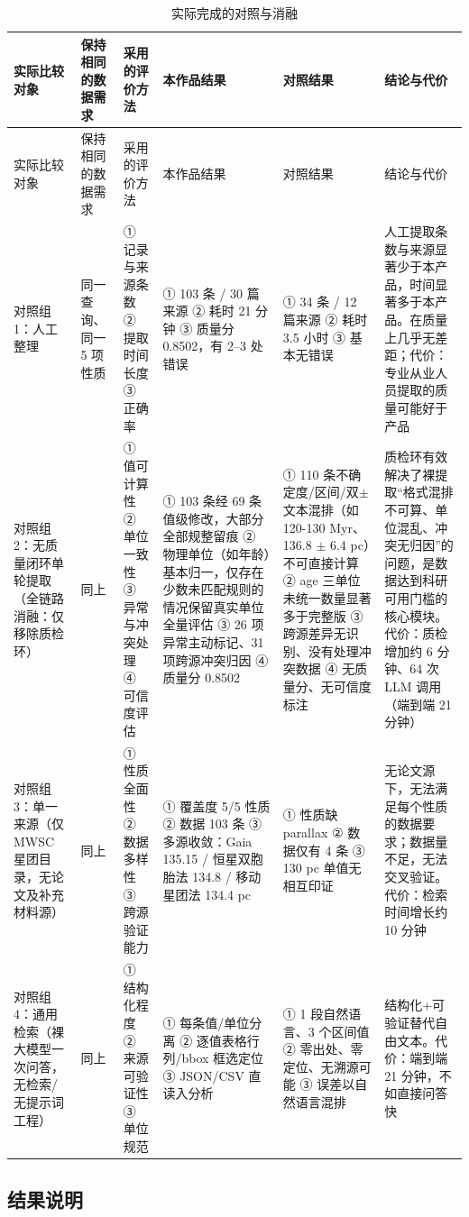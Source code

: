 \begin{longtable}{@{}p{2.3cm}p{1.9cm}p{2.4cm}p{3.0cm}p{2.9cm}p{2.2cm}@{}}
\caption{实际完成的对照与消融}\label{tab:ablation}\\
\toprule
实际比较对象 & 保持相同的数据需求 & 采用的评价方法 & 本作品结果 & 对照结果 & 结论与代价 \\
\midrule
\endfirsthead
\toprule
实际比较对象 & 保持相同的数据需求 & 采用的评价方法 & 本作品结果 & 对照结果 & 结论与代价 \\
\midrule
\endhead
对照组 1：人工整理 & 同一查询、同一 5 项性质 & ① 记录与来源条数 ② 提取时间长度 ③ 正确率 & ① 103 条 / 30 篇来源 ② 耗时 21 分钟 ③ 质量分 0.8502，有 2--3 处错误 & ① 34 条 / 12 篇来源 ② 耗时 3.5 小时 ③ 基本无错误 & 人工提取条数与来源显著少于本产品，时间显著多于本产品。在质量上几乎无差距；代价：专业从业人员提取的质量可能好于产品 \\
对照组 2：无质量闭环单轮提取（全链路消融：仅移除质检环） & 同上 & ① 值可计算性 ② 单位一致性 ③ 异常与冲突处理 ④ 可信度评估 & ① 103 条经 69 条值级修改，大部分全部规整留痕 ② 物理单位（如年龄）基本归一，仅存在少数未匹配规则的情况保留真实单位全量评估 ③ 26 项异常主动标记、31 项跨源冲突归因 ④ 质量分 0.8502 & ① 110 条不确定度/区间/双$\pm$ 文本混排（如 120-130 Myr、136.8 $\pm$ 6.4 pc）不可直接计算 ② age 三单位未统一数量显著多于完整版 ③ 跨源差异无识别、没有处理冲突数据 ④ 无质量分、无可信度标注 & 质检环有效解决了裸提取“格式混排不可算、单位混乱、冲突无归因”的问题，是数据达到科研可用门槛的核心模块。代价：质检增加约 6 分钟、64 次 LLM 调用（端到端 21 分钟） \\
对照组 3：单一来源（仅 MWSC 星团目录，无论文及补充材料源） & 同上 & ① 性质全面性 ② 数据多样性 ③ 跨源验证能力 & ① 覆盖度 5/5 性质 ② 数据 103 条 ③ 多源收敛：Gaia 135.15 / 恒星双胞胎法 134.8 / 移动星团法 134.4 pc & ① 性质缺 parallax ② 数据仅有 4 条 ③ 130 pc 单值无相互印证 & 无论文源下，无法满足每个性质的数据要求；数据量不足，无法交叉验证。代价：检索时间增长约 10 分钟 \\
对照组 4：通用检索（裸大模型一次问答，无检索/无提示词工程） & 同上 & ① 结构化程度 ② 来源可验证性 ③ 单位规范 & ① 每条值/单位分离 ② 逐值表格行列/bbox 框选定位 ③ JSON/CSV 直读入分析 & ① 1 段自然语言、3 个区间值 ② 零出处、零定位、无溯源可能 ③ 误差以自然语言混排 & 结构化+可验证替代自由文本。代价：端到端 21 分钟，不如直接问答快 \\
\bottomrule
\end{longtable}

\subsection{结果说明}

